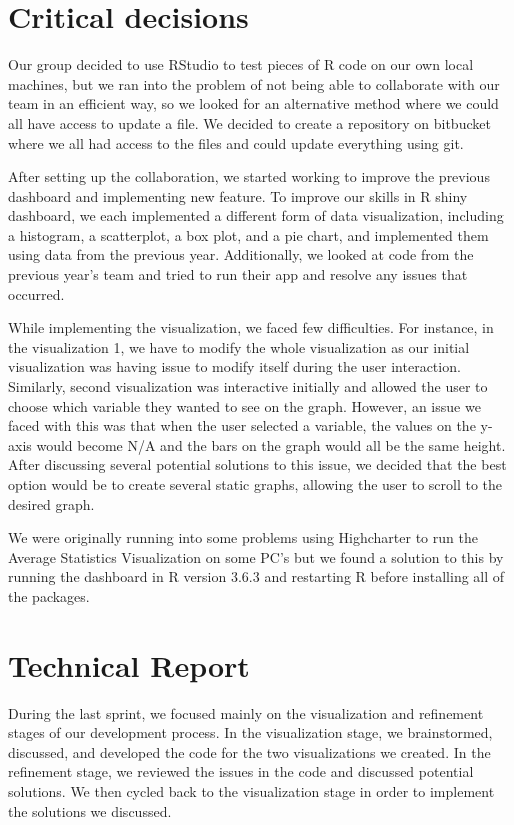 \documentclass[]{book}
\begin{document}
\hypertarget{critical-decisions}{%
\section{Critical decisions}\label{critical-decisions}}

Our group decided to use RStudio to test pieces of R code on our own local machines, but we ran into the problem of not being able to collaborate with our team in an efficient way, so we looked for an alternative method where we could all have access to update a file. We decided to create a repository on bitbucket where we all had access to the files and could update everything using git.

After setting up the collaboration, we started working to improve the previous dashboard and implementing new feature. To improve our skills in R shiny dashboard, we each implemented a different form of data visualization, including a histogram, a scatterplot, a box plot, and a pie chart, and implemented them using data from the previous year. Additionally, we looked at code from the previous year's team and tried to run their app and resolve any issues that occurred.

While implementing the visualization, we faced few difficulties. For instance, in the visualization 1, we have to modify the whole visualization as our initial visualization was having issue to modify itself during the user interaction. Similarly, second visualization was interactive initially and allowed the user to choose which variable they wanted to see on the graph. However, an issue we faced with this was that when the user selected a variable, the values on the y-axis would become N/A and the bars on the graph would all be the same height. After discussing several potential solutions to this issue, we decided that the best option would be to create several static graphs, allowing the user to scroll to the desired graph.

We were originally running into some problems using Highcharter to run the Average Statistics Visualization on some PC's but we found a solution to this by running the dashboard in R version 3.6.3 and restarting R before installing all of the packages.

\hypertarget{technical-report}{%
\section{Technical Report}\label{technical-report}}

During the last sprint, we focused mainly on the visualization and refinement stages of our development process. In the visualization stage, we brainstormed, discussed, and developed the code for the two visualizations we created. In the refinement stage, we reviewed the issues in the code and discussed potential solutions. We then cycled back to the visualization stage in order to implement the solutions we discussed.
\end{document}
